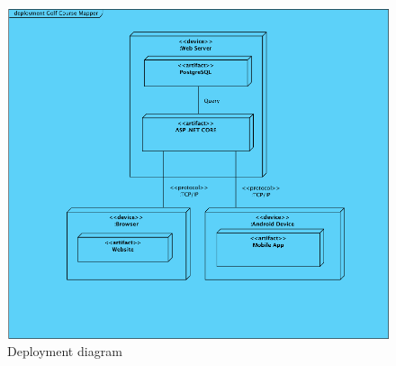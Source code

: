 \documentclass{article}
\begin{document}
    \begin{center}
        \begin{figure}[h]
            \centering
            \includegraphics[scale=0.9]{DeploymentDiagram}
            \caption{Deployment diagram}
            \label{deploymentdiagram}
        \end{figure}
    \end{center}
\end{document}
